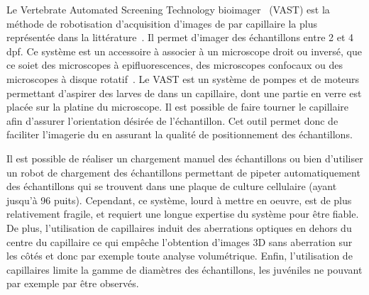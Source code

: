 \documentclass[\main/main.tex]{subfiles}
\begin{document}
\label{sec:vast}
Le Vertebrate Automated Screening Technology bioimager~\cite{pardomartin_2010} (VAST) est la méthode de robotisation d'acquisition d'images de \pz{} par capillaire la plus représentée dans la littérature~\cite{jarque_2018,teixid_2019}. Il permet d'imager des échantillons entre 2 et 4 dpf.
%
Ce système est un accessoire à associer à un microscope droit ou inversé, que ce soiet des microscopes à epifluorescences, des microscopes confocaux ou des microscopes à disque rotatif~\cite{early_2018, guo_2017}.
%
Le VAST est un système de pompes et de moteurs permettant d'aspirer des larves de \pz{} dans un capillaire, dont une partie en verre est placée sur la platine du microscope. 
%
Il est possible de faire tourner le capillaire afin d'assurer l'orientation désirée de l'échantillon.
%
Cet outil permet donc de faciliter l'imagerie du \pz{} en assurant la qualité de positionnement des échantillons.

%
Il est possible de réaliser un chargement manuel des échantillons ou bien d'utiliser un robot de chargement des échantillons permettant de pipeter automatiquement des échantillons qui se trouvent dans une plaque de culture cellulaire (ayant jusqu'à 96 puits).
%
Cependant, ce système, lourd à mettre en oeuvre, est de plus relativement fragile, et requiert une longue expertise du système pour être fiable.
De plus, l'utilisation de capillaires induit des aberrations optiques en dehors du centre du capillaire ce qui empêche l'obtention d'images 3D sans aberration sur les côtés et donc par exemple toute analyse volumétrique. Enfin, l'utilisation de capillaires limite la gamme de diamètres des échantillons, les juvéniles ne pouvant par exemple par être observés.
\end{document}
